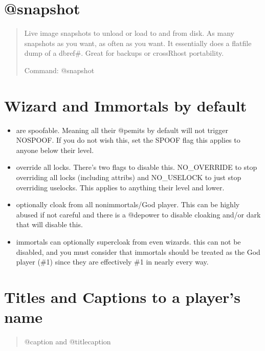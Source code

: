 \documentclass[letterpaper,10pt,english]{sphinxmanual}
\begin{document}
\section{@snapshot}
\label{\detokenize{features:snapshot}}\begin{quote}

\sphinxAtStartPar
Live image snapshots to unload or load to and from
disk.  As many snapshots as you want, as often as you want.
It essentially does a flatfile dump of a dbref\#.  Great for
backups or cross\sphinxhyphen{}Rhost portability.

\sphinxAtStartPar
Command: @snapshot
\end{quote}


\section{Wizard and Immortals by default}
\label{\detokenize{features:wizard-and-immortals-by-default}}\begin{itemize}
\item {} 
\sphinxAtStartPar
are spoofable.  Meaning all their @pemits by default will not
trigger NOSPOOF.  If you do not wish this, set the SPOOF flag
this applies to anyone below their level.

\item {} 
\sphinxAtStartPar
override all locks.  There’s two flags to disable this.
NO\_OVERRIDE to stop overriding all locks (including attribs)
and NO\_USELOCK to just stop overriding uselocks.
This applies to anything their level and lower.

\item {} 
\sphinxAtStartPar
optionally cloak from all non\sphinxhyphen{}immortals/God player.
This can be highly abused if not careful and there
is a @depower to disable cloaking and/or dark that will
disable this.

\item {} 
\sphinxAtStartPar
immortals can optionally supercloak from even wizards.
this can not be disabled, and you must consider that immortals
should be treated as the God player (\#1) since they are
effectively \#1 in nearly every way.

\end{itemize}


\section{Titles and Captions to a player’s name}
\label{\detokenize{features:titles-and-captions-to-a-player-s-name}}\begin{quote}

\sphinxAtStartPar
@caption and @titlecaption
\end{quote}
\end{document}
